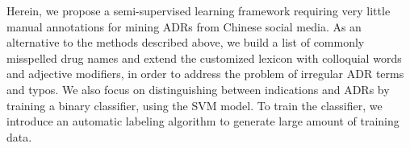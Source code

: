 Herein, we propose a semi-supervised learning framework requiring very little manual annotations for mining ADRs from Chinese social media. As an alternative to the methods described above, we build a list of commonly misspelled drug names and extend the customized lexicon with colloquial words and adjective modifiers, in order to address the problem of irregular ADR terms and typos. We also focus on distinguishing between indications and ADRs by training a binary classifier, using the SVM model. To train the classifier, we introduce an automatic labeling algorithm to generate large amount of training data.
